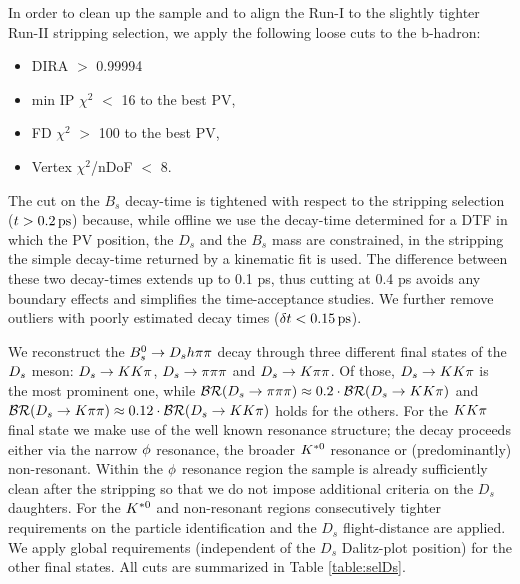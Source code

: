 In order to clean up the sample and to align the Run-I to the slightly tighter Run-II stripping selection, we apply the following loose cuts to the b-hadron:
\begin{itemize}
\item DIRA $>$ 0.99994
\item min IP $\chi^{2}$ $<$ 16 to the best PV,
\item FD $\chi^{2}$ $>$ 100 to the best PV,
\item Vertex $\chi^{2}$/nDoF $<$ 8.
\end{itemize}    
The cut on the $B_s$ decay-time is tightened with respect to the stripping selection ($t > 0.2 {\mathrm{ \,ps}}$) because, while offline we use the decay-time determined for a DTF in which the PV position, the $D_s$ and the $B_s$ mass are constrained, in the stripping the simple decay-time returned by a kinematic fit is used. 
The difference between these two decay-times extends up to 0.1 ps, thus cutting at 0.4 ps avoids any boundary effects and simplifies the time-acceptance studies.
We further remove outliers with poorly estimated decay times ($\delta t< 0.15 {\mathrm{ \,ps}}$).

We reconstruct the ${{B}^0_{s}}\rightarrow{\ensuremath{{D}_{s}}} h{\pi}{\pi}$ decay through three different final states of the ${{D}_{s}}$ meson: ${{D}_{s}}\rightarrow{\ensuremath{K}}{\ensuremath{K}}{\ensuremath{\pi}}$, ${{D}_{s}}\rightarrow{\ensuremath{\pi}}{\ensuremath{\pi}}{\ensuremath{\pi}}$ and ${{D}_{s}}\rightarrow{\ensuremath{K}}{\ensuremath{\pi}}{\ensuremath{\pi}}$.
Of those, ${{D}_{s}}\rightarrow{\ensuremath{K}}{\ensuremath{K}}{\ensuremath{\pi}}$ is the most prominent one,
while $\mathcal{BR}({{D}_{s}}\rightarrow{\ensuremath{\pi}}{\ensuremath{\pi}}{\ensuremath{\pi}}) \approx 0.2\cdot\mathcal{BR}({{D}_{s}}\rightarrow{\ensuremath{K}}{\ensuremath{K}}{\ensuremath{\pi}})$ and $\mathcal{BR}({{D}_{s}}\rightarrow{\ensuremath{K}}{\ensuremath{\pi}}{\ensuremath{\pi}}) \approx 0.12\cdot\mathcal{BR}({{D}_{s}}\rightarrow{\ensuremath{K}}{\ensuremath{K}}{\ensuremath{\pi}})$ holds for the others. 
For the ${K}{K}{\pi}$  final state we make use of the well known resonance structure;
the decay proceeds either via the narrow $\phi$ resonance, the broader ${{K}^{*0}}$ resonance or (predominantly) non-resonant.
Within the $\phi$ resonance region the sample is already sufficiently clean after the stripping so that we do not impose additional criteria on the $D_s$ daughters.
For the ${{K}^{*0}}$ and non-resonant regions consecutively tighter requirements on the particle identification and the $D_s$ flight-distance are applied. 
We apply global requirements (\ie independent of the $D_s$ Dalitz-plot position) for the other final states. All cuts are summarized in Table \ref{table:selDs}.


